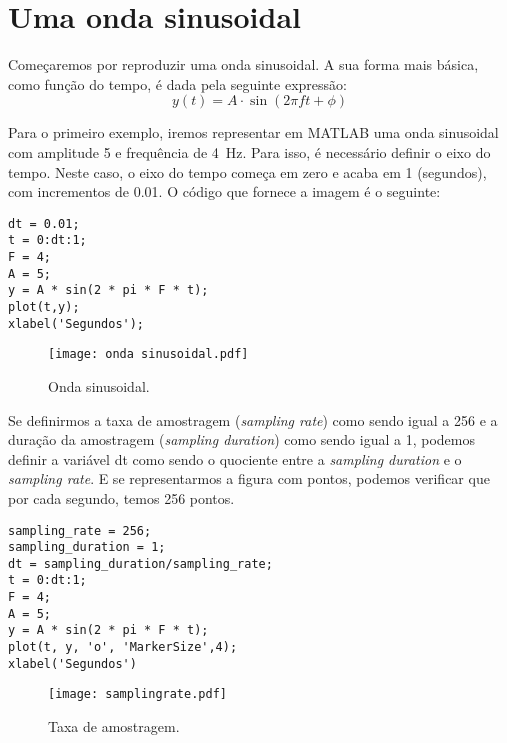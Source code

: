 \section{Uma onda sinusoidal}

Começaremos por reproduzir uma onda sinusoidal. A sua forma mais básica, como função do tempo, é dada pela seguinte expressão:
\begin{equation}
    y(t) = A\cdot \sin \left(2\pi f t + \phi\right)
\end{equation}

Para o primeiro exemplo, iremos representar em MATLAB uma onda sinusoidal com amplitude 5 e frequência de 4~Hz. Para isso, é necessário definir o eixo do tempo. Neste caso, o eixo do tempo começa em zero e acaba em 1 (segundos), com incrementos de 0.01. O código que fornece a imagem é o seguinte:

\begin{lstlisting}[style=Matlab-editor, basicstyle=\small, caption={Slide 2.}, label={lst: onda sinusoidal}]
dt = 0.01;
t = 0:dt:1;
F = 4;
A = 5;
y = A * sin(2 * pi * F * t);
plot(t,y);
xlabel('Segundos');
\end{lstlisting}

\begin{figure}[!ht]
\centering
\texttt{[image: onda sinusoidal.pdf]}
\caption{Onda sinusoidal.}
\label{fig:onda sinusoidal}
\end{figure}

\newpage

Se definirmos a taxa de amostragem (\emph{sampling rate}) como sendo igual a 256 e a duração da amostragem (\emph{sampling duration}) como sendo igual a 1, podemos definir a variável dt como sendo o quociente entre a \emph{sampling duration} e o \emph{sampling rate}. E se representarmos a figura com pontos, podemos verificar que por cada segundo, temos 256 pontos.

\begin{lstlisting}[style=Matlab-editor, basicstyle=\small, caption={Slide 3.}, label={lst: sampling rate}]
sampling_rate = 256;
sampling_duration = 1; 
dt = sampling_duration/sampling_rate;
t = 0:dt:1;
F = 4;
A = 5;
y = A * sin(2 * pi * F * t);
plot(t, y, 'o', 'MarkerSize',4);
xlabel('Segundos')
\end{lstlisting}
    
\begin{figure}[!ht]
\centering
\texttt{[image: samplingrate.pdf]}
\caption{Taxa de amostragem.}
\label{fig:sampling rate}
\end{figure}

